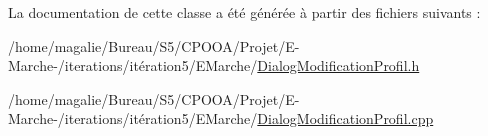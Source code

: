 La documentation de cette classe a été générée à partir des fichiers suivants \-:\begin{DoxyCompactItemize}
\item 
/home/magalie/\-Bureau/\-S5/\-C\-P\-O\-O\-A/\-Projet/\-E-\/\-Marche-\//iterations/itération5/\-E\-Marche/\hyperlink{_dialog_modification_profil_8h}{Dialog\-Modification\-Profil.\-h}\item 
/home/magalie/\-Bureau/\-S5/\-C\-P\-O\-O\-A/\-Projet/\-E-\/\-Marche-\//iterations/itération5/\-E\-Marche/\hyperlink{_dialog_modification_profil_8cpp}{Dialog\-Modification\-Profil.\-cpp}\end{DoxyCompactItemize}
